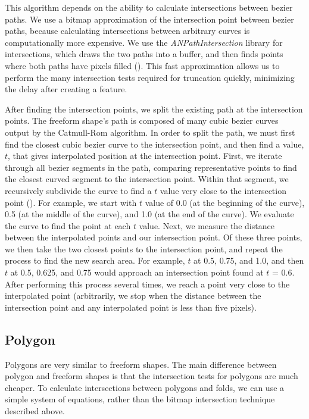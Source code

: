 This algorithm depends on the ability to calculate intersections between
bezier paths. We use a bitmap approximation of the intersection point
between bezier paths, because calculating intersections between
arbitrary curves is computationally more expensive. We use the
\emph{ANPathIntersection} library for intersections, which draws the two
paths into a buffer, and then finds points where both paths have pixels
filled (\citet{ANPathIntersection}). This fast approximation allows us
to perform the many intersection tests required for truncation quickly,
minimizing the delay after creating a feature.

After finding the intersection points, we split the existing path at the
intersection points. The freeform shape's path is composed of many cubic
bezier curves output by the Catmull-Rom algorithm. In order to split the
path, we must first find the closest cubic bezier curve to the
intersection point, and then find a value, \(t\), that gives
interpolated position at the intersection point. First, we iterate
through all bezier segments in the path, comparing representative points
to find the closest curved segment to the intersection point. Within
that segment, we recursively subdivide the curve to find a \(t\) value
very close to the intersection point (\citet{phillips1997casteljau}).
For example, we start with \(t\) value of 0.0 (at the beginning of the
curve), 0.5 (at the middle of the curve), and 1.0 (at the end of the
curve). We evaluate the curve to find the point at each \(t\) value.
Next, we measure the distance between the interpolated points and our
intersection point. Of these three points, we then take the two closest
points to the intersection point, and repeat the process to find the new
search area. For example, \(t\) at 0.5, 0.75, and 1.0, and then \(t\) at
0.5, 0.625, and 0.75 would approach an intersection point found at \(t\)
= 0.6. After performing this process several times, we reach a point
very close to the interpolated point (arbitrarily, we stop when the
distance between the intersection point and any interpolated point is
less than five pixels).

\subsection{Polygon}\label{polygon}

Polygons are very similar to freeform shapes. The main difference
between polygon and freeform shapes is that the intersection tests for
polygons are much cheaper. To calculate intersections between polygons
and folds, we can use a simple system of equations, rather than the
bitmap intersection technique described above.

